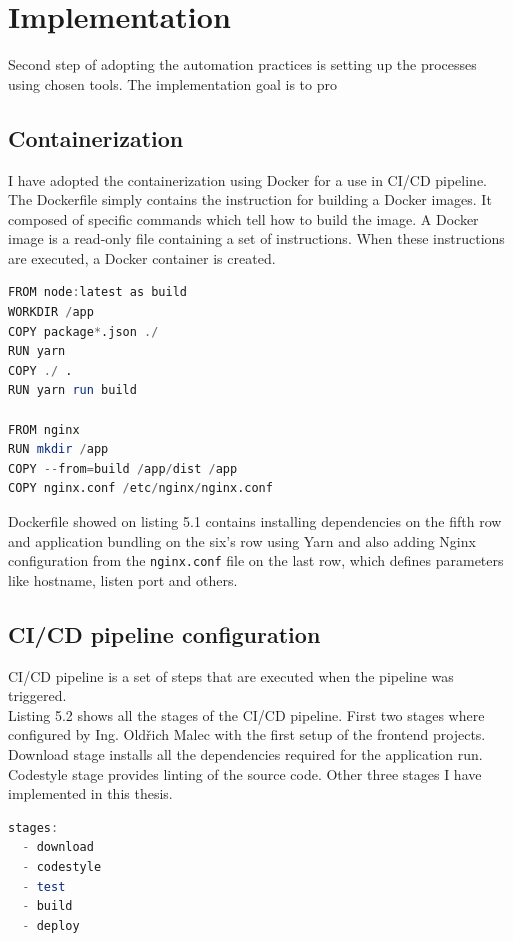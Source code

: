 \section{Implementation} Second step of adopting the automation practices is setting up the processes using chosen tools. The implementation goal is to pro 


\subsection{Containerization}  I have adopted the containerization using Docker for a use in CI/CD pipeline. The Dockerfile simply contains the instruction for building a Docker images. It composed of specific commands which tell how to build the image. A Docker image is a read-only file containing a set of instructions. When these instructions are executed, a Docker container is created. 


\begin{lstlisting}[language=Octave, caption=Dockerfile]
FROM node:latest as build
WORKDIR /app
COPY package*.json ./
RUN yarn
COPY ./ .
RUN yarn run build

FROM nginx
RUN mkdir /app
COPY --from=build /app/dist /app
COPY nginx.conf /etc/nginx/nginx.conf
\end{lstlisting}

\noindent Dockerfile showed on listing 5.1 contains installing dependencies on the fifth row and application bundling on the six's row using Yarn and also adding Nginx configuration from the \texttt{nginx.conf} file on the last row, which defines parameters like hostname, listen port and others.



\subsection{CI/CD pipeline configuration} CI/CD pipeline is a set of steps that are executed when the pipeline was triggered.\\
Listing 5.2 shows all the stages of the CI/CD pipeline. First two stages where configured by Ing. Oldřich Malec with the first setup of the frontend projects. Download stage installs all the dependencies required for the application run. Codestyle stage provides linting of the source code. Other three stages I have implemented in this thesis.
\begin{lstlisting}[language=Octave, caption=Gitlab CI/CD stages]
stages:
  - download
  - codestyle
  - test
  - build
  - deploy
\end{lstlisting}


